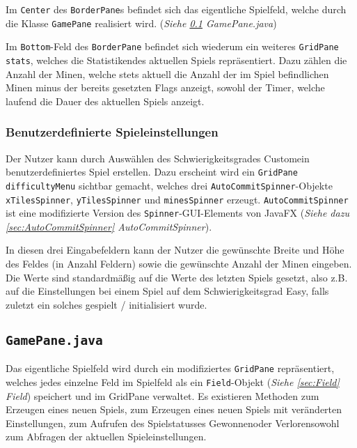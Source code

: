\documentclass[oneside,12pt]{scrartcl}
\newcommand*{\EnableHyphenationInTexttt}{\hyphenchar\font=45\relax}%
\newcommand{\class}[1]{\textcolor{Green4}{\bcode{#1}}}
\newcommand{\attribute}[1]{\textcolor{SkyBlue3}{\bcode{#1}}}
\newcommand{\classattribute}[2]{\class{#1} \attribute{#2}}
\newcommand{\bcode}[1]{\texttt{\EnableHyphenationInTexttt#1}}
\begin{document}
Im \attribute{Center} des \class{BorderPane}s befindet sich das eigentliche Spielfeld, welche durch die Klasse \class{GamePane} realisiert wird. (\textit{Siehe \ref{sec:GamePane} GamePane.java})

Im \attribute{Bottom}-Feld des \class{BorderPane} befindet sich wiederum ein weiteres \classattribute{GridPane}{stats}, welches die \glqq Statistiken\grqq des aktuellen Spiels repräsentiert. Dazu zählen die Anzahl der Minen, welche stets aktuell die Anzahl der im Spiel befindlichen Minen minus der bereits gesetzten Flags anzeigt, sowohl der Timer, welche laufend die Dauer des aktuellen Spiels anzeigt.

\subsubsection{Benutzerdefinierte Spieleinstellungen}
Der Nutzer kann durch Auswählen des Schwierigkeitsgrades \glqq Custom\grqq ein benutzerdefiniertes Spiel erstellen. Dazu erscheint wird ein \attribute{GridPane difficultyMenu} sichtbar gemacht, welches drei \attribute{AutoCommitSpinner}-Objekte \attribute{xTilesSpinner}, \attribute{yTilesSpinner} und \attribute{minesSpinner} erzeugt. \class{AutoCommitSpinner} ist eine modifizierte Version des \class{Spinner}-GUI-Elements von JavaFX (\textit{Siehe dazu \ref{sec:AutoCommitSpinner} AutoCommitSpinner}).

In diesen drei Eingabefeldern kann der Nutzer die gewünschte Breite und Höhe des Feldes (in Anzahl Feldern) sowie die gewünschte Anzahl der Minen eingeben. Die Werte sind standardmäßig auf die Werte des letzten Spiels gesetzt, also z.B. auf die Einstellungen bei einem Spiel auf dem Schwierigkeitsgrad \glqq Easy\grqq, falls zuletzt ein solches gespielt / initialisiert wurde.

\subsection{\class{GamePane.java}}
\label{sec:GamePane}
Das eigentliche Spielfeld wird durch ein modifiziertes \class{GridPane} repräsentiert, welches jedes einzelne Feld im Spielfeld als ein \class{Field}-Objekt (\textit{Siehe \ref{sec:Field} Field}) speichert und im GridPane verwaltet. Es existieren Methoden zum Erzeugen eines neuen Spiels, zum Erzeugen eines neuen Spiels mit veränderten Einstellungen, zum Aufrufen des Spielstatusses \glqq Gewonnen\grqq oder \glqq Verloren\grqq sowohl zum Abfragen der aktuellen Spieleinstellungen.
\end{document}

